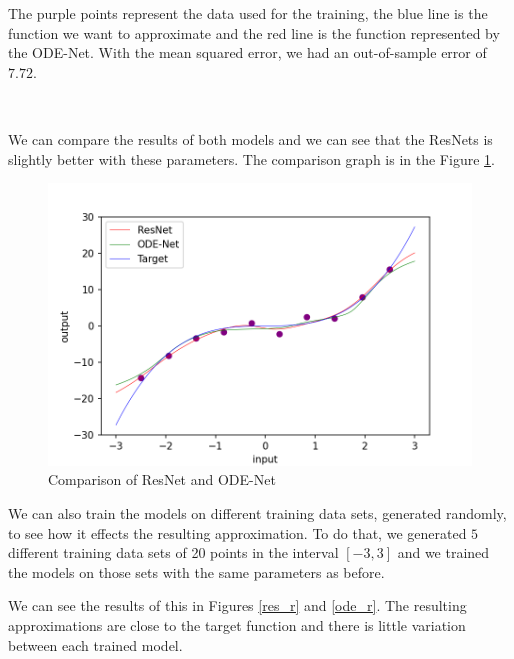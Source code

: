 \documentclass[10pt,a4paper]{article}
\theoremstyle{definition}
\theoremstyle{plain}
\begin{document}
The purple points represent the data used for the training, the blue line is the function we want to approximate and the red line is the function represented by the ODE-Net. With the mean squared error, we had an out-of-sample error of $7.72$.

~

We can compare the results of both models and we can see that the ResNets is slightly better with these parameters. The comparison graph is in the Figure \ref{comparaison}.
\begin{figure}[!h]
\center
\includegraphics[scale=0.75]{comparaison_final.png}
\caption{Comparison of ResNet and ODE-Net}
\label{comparaison}
\end{figure}


We can also train the models on different training data sets, generated randomly, to see how it effects the resulting approximation. To do that, we generated $5$ different training data sets of 20 points in the interval $[-3,3]$ and we trained the models on those sets with the same parameters as before.

We can see the results of this in Figures \ref{res_r} and \ref{ode_r}. The resulting approximations are close to the target function and there is little variation between each trained model.
\end{document}
